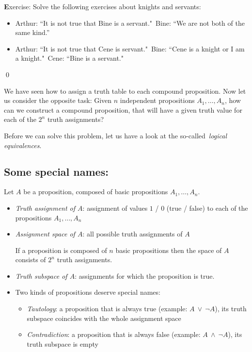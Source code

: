 \documentclass[11pt,paper=b5,footinclude,headinclude]{scrbook} %
\def\ali {{~\vee~}}
\def\inn {{~\wedge~}}
\theoremstyle{remark}
\theoremstyle{definition} %
\begin{document}
\medskip

{\textbf Exercise:} Solve the following exercises about knights and servants:
\begin{itemize}
  \item Arthur: ``It is not true that Bine is a servant."~Bine: ``We are not both of the same kind.''
  \item Arthur: ``It is not true that Cene is servant."~Bine: ``Cene is a knight or I am a knight."~Cene: ``Bine is a servant."
\end{itemize}
\qed


\medskip
We have seen how to assign a truth table to each compound proposition. Now let us consider the opposite task:
Given $n$ independent propositions $A_1,\ldots, A_n$,
how can we construct a compound proposition, that will have a given truth value for each of the  $2^n$ truth assignments?

Before we can solve this problem, let us have a look at the so-called~{\em logical equivalences}.


\subsection*{Some special names:}
\bigskip
Let $A$ be a proposition, composed of basic propositions $A_1,\ldots, A_n$.

\begin{itemize}
	\item {\em Truth assignment of $A$}: assignment of values $1$ / $0$ (true / false) to each of the propositions $A_1,\ldots, A_n$
	
	\item {\em Assignment space of $A$}: all possible truth assignments of $A$
	
	If a proposition is composed of $n$ basic propositions then the space of $A$ consists of $2^n$ truth assignments.
	
	\item {\em Truth subspace  of $A$}: assignments for which the proposition is true.
	
	\item
	Two kinds of propositions deserve special names:
	\begin{itemize}
		\item {\em Tautology}: a proposition that is always true (example: $A\ali \neg A$),
		its truth subspace coincides with the whole assignment space
		\item {\em Contradiction}: a proposition that is always false (example: $A\inn \neg A$),
		its truth subspace is empty
	\end{itemize}
	
\end{itemize}
\end{document}

